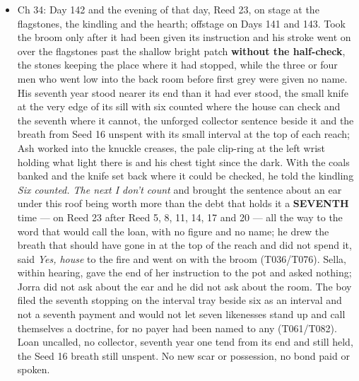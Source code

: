 \documentclass{design/chronicle}
\begin{document}
{\begin{itemize}[leftmargin=1.4em,itemsep=1pt,topsep=3pt,parsep=0pt]
\item Ch 34: Day 142 and the evening of that day, Reed 23, on stage at the flagstones, the kindling and the hearth; offstage on Days 141 and 143. Took the broom only after it had been given its instruction and his stroke went on over the flagstones past the shallow bright patch \textbf{without the half-check}, the stones keeping the place where it had stopped, while the three or four men who went low into the back room before first grey were given no name. His seventh year stood nearer its end than it had ever stood, the small knife at the very edge of its sill with six counted where the house can check and the seventh where it cannot, the unforged collector sentence beside it and the breath from Seed 16 unspent with its small interval at the top of each reach; Ash worked into the knuckle creases, the pale clip-ring at the left wrist holding what light there is and his chest tight since the dark. With the coals banked and the knife set back where it could be checked, he told the kindling \emph{Six counted. The next I don’t count} and brought the sentence about an ear under this roof being worth more than the debt that holds it a \textbf{SEVENTH} time — on Reed 23 after Reed 5, 8, 11, 14, 17 and 20 — all the way to the word that would call the loan, with no figure and no name; he drew the breath that should have gone in at the top of the reach and did not spend it, said \emph{Yes, house} to the fire and went on with the broom (T036/T076). Sella, within hearing, gave the end of her instruction to the pot and asked nothing; Jorra did not ask about the ear and he did not ask about the room. The boy filed the seventh stopping on the interval tray beside six as an interval and not a seventh payment and would not let seven likenesses stand up and call themselves a doctrine, for no payer had been named to any (T061/T082). Loan uncalled, no collector, seventh year one tend from its end and still held, the Seed 16 breath still unspent. No new scar or possession, no bond paid or spoken.

\end{itemize}

\begin{itemize}[leftmargin=1.4em,itemsep=1pt,topsep=3pt,parsep=0pt]


\end{itemize}}
\end{document}
